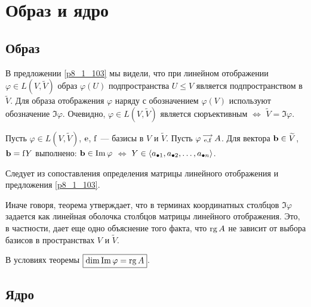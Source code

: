 \section{Образ и ядро}


\subsection{Образ}

В предложении \ref{p8_1_103} мы видели, что при линейном отображении $\varphi \in L(V, \widetilde{V})$ образ $\varphi (U)$ подпространства $U\leq V$
является подпространством в  $\widetilde{V}$.
Для образа отображения $\varphi $ наряду с обозначением $\varphi (V)$ используют обозначение $\Im \varphi$.
Очевидно, $\varphi \in L(V, \widetilde{V})$ является сюръективным $\Leftrightarrow$ $\widetilde{V} = \Im \varphi$.


\begin{theor}\label{t8_2_111}
Пусть $\varphi \in L(V, \widetilde{V})$,  $\mathrm{e}$, $\mathrm{f}$ --- базисы в $V$ и $\widetilde{V}$.
Пусть $\varphi \begin{smallmatrix} \longrightarrow \\ \mathrm{e}, \mathrm{f} \end{smallmatrix} A$.
Для вектора $\mathbf{b} \in \widetilde{V}$, $\mathbf{b}=\mathrm{f}Y$ выполнено:
$\mathbf{b} \in \mathop{\rm Im}\nolimits \varphi$ $\Leftrightarrow$ $Y\in \langle a_{\bullet 1}, a_{\bullet 2}, \ldots, a_{\bullet n} \rangle$.
\end{theor}
\dok  Следует из сопоставления определения матрицы линейного отображения и предложения \ref{p8_1_103}.
\edok

Иначе говоря, теорема утверждает, что в терминах координатных столбцов $\Im \varphi$ задается 
как линейная оболочка столбцов матрицы линейного отображения.
Это, в частности, дает еще одно объяснение того факта, что 
$\mathop{\rm rg}\nolimits A$ не зависит от выбора базисов в пространствах $V$ и $\widetilde{V}$.

\begin{sled}
В условиях теоремы $\boxed{\mathop{\rm dim}\nolimits \mathop{\rm Im}\nolimits \varphi = \mathop{\rm rg}\nolimits A} $.
\end{sled}


\subsection{Ядро}

